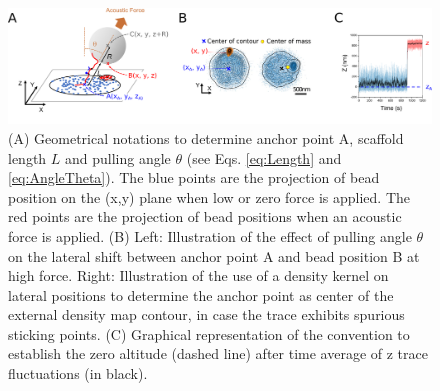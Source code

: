 \documentclass{biophys-new}
\begin{document}
\begin{figure}[hbt!]
	\centering

	\includegraphics[width=1\linewidth]{Figures/figS2.png}

	\caption{(A) Geometrical notations to determine anchor point A, scaffold length $L$ and pulling angle $\theta$ (see Eqs. \ref{eq:Length} and \ref{eq:AngleTheta}). The blue points are the projection of bead position on the (x,y) plane when low or zero force is applied. The red points are the projection of bead positions when an acoustic force is applied. (B) Left: Illustration of the effect of pulling angle $\theta$ on the lateral shift between anchor point A and bead position B at high force. Right: Illustration of the use of a density kernel on lateral positions to determine the anchor point as center of the external density map contour, in case the trace exhibits spurious sticking points. (C) Graphical representation of the convention to establish the zero altitude (dashed line) after time average of z trace fluctuations (in black).}
	\label{fig:Lengthcalculation}
\end{figure}


\end{document}
